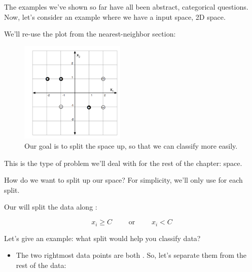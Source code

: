         The examples we've shown so far have all been abstract, categorical questions. Now, let's consider an example where we have a  input space, 2D space.

        We'll re-use the plot from the nearest-neighbor section:

        \begin{figure}[H]
            \centering
            \includegraphics[width=50mm,scale=0.5]{images/nonparametric_images/classification_example.png}

            \caption*{Our goal is to split the space up, so that we can classify more easily.}
        \end{figure}

        This is the type of problem we'll deal with for the rest of the chapter:  space.

        How do we want to split up our space? For simplicity, we'll only use  for each split.\\

        \begin{definition}
            Our  will split the data along :

            \begin{equation*}
                x_i \geq C \qquad \text{ or } \qquad x_i < C
            \end{equation*}
            
        \end{definition}

         Let's give an example: what split would help you classify data?
         
         \begin{itemize}
             \item The two rightmost data points are both . So, let's separate them from the rest of the data:
         \end{itemize}


